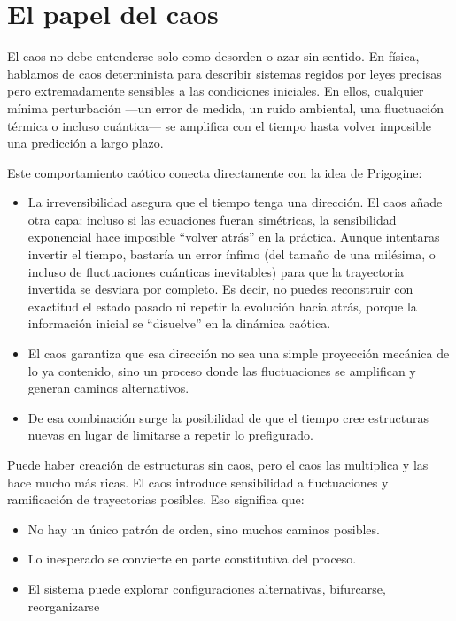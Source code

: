 \documentclass[
  10pt,
  a4paper,
  DIV=11,
  numbers=noendperiod,
  open=any]{scrreprt}
\numberwithin{equation}{chapter}
\numberwithin{equation}{section}
\renewcommand{\[}{\begin{equation}}
\renewcommand{\]}{\end{equation}}
\begin{document}
\chapter{El papel del caos}\label{el-papel-del-caos}

El caos no debe entenderse solo como desorden o azar sin sentido. En
física, hablamos de caos determinista para describir sistemas regidos
por leyes precisas pero extremadamente sensibles a las condiciones
iniciales. En ellos, cualquier mínima perturbación ---un error de
medida, un ruido ambiental, una fluctuación térmica o incluso
cuántica--- se amplifica con el tiempo hasta volver imposible una
predicción a largo plazo.

Este comportamiento caótico conecta directamente con la idea de
Prigogine:

\begin{itemize}
\item
  La irreversibilidad asegura que el tiempo tenga una dirección. El caos
  añade otra capa: incluso si las ecuaciones fueran simétricas, la
  sensibilidad exponencial hace imposible ``volver atrás'' en la
  práctica. Aunque intentaras invertir el tiempo, bastaría un error
  ínfimo (del tamaño de una milésima, o incluso de fluctuaciones
  cuánticas inevitables) para que la trayectoria invertida se desviara
  por completo. Es decir, no puedes reconstruir con exactitud el estado
  pasado ni repetir la evolución hacia atrás, porque la información
  inicial se ``disuelve'' en la dinámica caótica.
\item
  El caos garantiza que esa dirección no sea una simple proyección
  mecánica de lo ya contenido, sino un proceso donde las fluctuaciones
  se amplifican y generan caminos alternativos.
\item
  De esa combinación surge la posibilidad de que el tiempo cree
  estructuras nuevas en lugar de limitarse a repetir lo prefigurado.
\end{itemize}

Puede haber creación de estructuras sin caos, pero el caos las
multiplica y las hace mucho más ricas. El caos introduce sensibilidad a
fluctuaciones y ramificación de trayectorias posibles. Eso significa
que:

\begin{itemize}
\item
  No hay un único patrón de orden, sino muchos caminos posibles.
\item
  Lo inesperado se convierte en parte constitutiva del proceso.
\item
  El sistema puede explorar configuraciones alternativas, bifurcarse,
  reorganizarse
\end{itemize}
\end{document}
